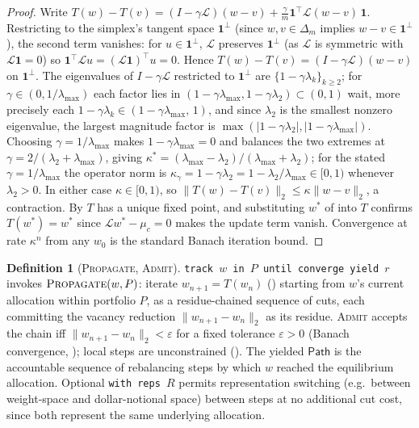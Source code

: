 \documentclass[11pt,a4paper]{article}
\theoremstyle{thmstyle}
\theoremstyle{definition}
\newtheorem{definition}[theorem]{Definition}
\theoremstyle{remark}
\newcommand{\sh}[1]{\texttt{#1}}
\newcommand{\abs}[1]{\lvert#1\rvert}
\newcommand{\norm}[1]{\lVert#1\rVert}
\newcommand{\Lap}{\mathcal{L}}
\newcommand{\simplex}{\Delta_m}
\newcommand{\eps}{\varepsilon}
\begin{document}
\begin{proof}
Write $T(w)-T(v) = (I-\gamma\Lap)(w-v) + \tfrac{\gamma}{m}\mathbf{1}^\top\Lap(w-v)\,\mathbf{1}$.
Restricting to the simplex's tangent space $\mathbf{1}^\perp$ (since
$w,v\in\simplex$ implies $w-v\in\mathbf{1}^\perp$), the second term
vanishes: for $u\in\mathbf{1}^\perp$, $\Lap$ preserves $\mathbf{1}^\perp$
(as $\Lap$ is symmetric with $\Lap\mathbf{1}=0$) so
$\mathbf{1}^\top\Lap u=(\Lap\mathbf{1})^\top u=0$. Hence
$T(w)-T(v)=(I-\gamma\Lap)(w-v)$ on $\mathbf{1}^\perp$. The eigenvalues
of $I-\gamma\Lap$ restricted to $\mathbf{1}^\perp$ are
$\{1-\gamma\lambda_k\}_{k\ge2}$; for $\gamma\in(0,1/\lambda_{\max})$
each factor lies in $(1-\gamma\lambda_{\max},1-\gamma\lambda_2)\subset(0,1)$
wait, more precisely each $1-\gamma\lambda_k\in(1-\gamma\lambda_{\max},\,1)$,
and since $\lambda_2$ is the smallest nonzero eigenvalue, the largest
magnitude factor is $\max(\abs{1-\gamma\lambda_2},\abs{1-\gamma\lambda_{\max}})$.
Choosing $\gamma=1/\lambda_{\max}$ makes $1-\gamma\lambda_{\max}=0$ and
balances the two extremes at
$\gamma=2/(\lambda_2+\lambda_{\max})$, giving
$\kappa^\ast=(\lambda_{\max}-\lambda_2)/(\lambda_{\max}+\lambda_2)$; for
the stated $\gamma=1/\lambda_{\max}$ the operator norm is
$\kappa_\gamma=1-\gamma\lambda_2=1-\lambda_2/\lambda_{\max}\in[0,1)$
whenever $\lambda_2>0$. In either case $\kappa\in[0,1)$, so
$\norm{T(w)-T(v)}_2\le\kappa\norm{w-v}_2$, a contraction. By
 $T$ has a unique fixed point, and substituting $w^\ast$
of  into $T$ confirms $T(w^\ast)=w^\ast$ since
$\Lap w^\ast-\mu_c=0$ makes the update term vanish. Convergence at rate
$\kappa^n$ from any $w_0$ is the standard Banach iteration bound.
\end{proof}

\begin{definition}[\textsc{Propagate}, \textsc{Admit}]
\label{def:propagate}
\sh{track\ $w$\ in\ $P$\ until\ converge\ yield\ $r$} invokes
$\textsc{Propagate}(w,P)$: iterate $w_{n+1}=T(w_n)$
() starting from $w$'s current allocation within
portfolio $P$, as a residue-chained sequence of cuts, each committing
the vacancy reduction $\norm{w_{n+1}-w_n}_2$ as its residue.
\textsc{Admit} accepts the chain iff
$\norm{w_{n+1}-w_n}_2<\eps$ for a fixed tolerance $\eps>0$ (Banach
convergence, ); local steps are unconstrained
(). The yielded $\mathsf{Path}$ is the accountable
sequence of rebalancing steps by which $w$ reached the equilibrium
allocation. Optional \sh{with\ reps\ }$R$ permits representation
switching (e.g.\ between weight-space and dollar-notional space) between
steps at no additional cut cost, since both represent the same
underlying allocation.
\end{definition}
\end{document}
